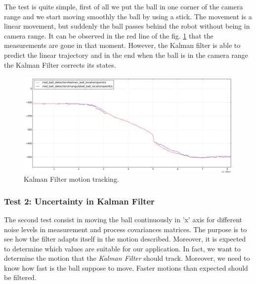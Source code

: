 The test is quite simple, first of all we put the ball in one corner of the camera range and we start moving smoothly the ball by using a stick. The movement is a linear movement, but suddenly the ball passes behind the robot without being in camera range. It can be observed in the red line of the fig. \ref{fig:kf_motion} that the measurements are gone in that moment. However, the Kalman filter is able to predict the linear trajectory and in the end when the ball is in the camera range the Kalman Filter corrects its states.
\begin{figure}[ht!]
    \centering
    \captionsetup{justification=centering,margin=1cm}
    \includegraphics[scale = 0.30]{Images/kf/motion_tracking.png}
    \caption[]{Kalman Filter motion tracking.}
    \label{fig:kf_motion}
\end{figure}%

\newpage
\subsubsection{Test 2: Uncertainty in Kalman Filter}

The second test consist in moving the ball continuously in 'x' axis for different noise levels in measurement and process covariances matrices. The purpose is to see how the filter adapts itself in the motion described. Moreover, it is expected to determine which values are suitable for our application. In fact, we want to determine the motion that the \textit{Kalman Filter} should track. Moreover, we need to know how fast is the ball suppose to move. Faster motions than expected should be filtered.

